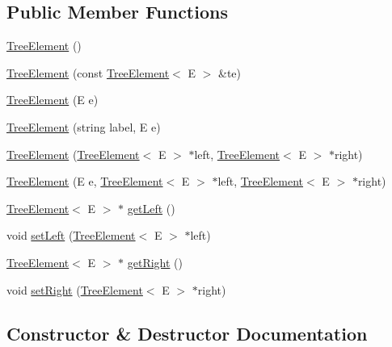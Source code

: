 \subsection*{Public Member Functions}
\begin{DoxyCompactItemize}
\item 
\hyperlink{classbridges_1_1_tree_element_a75e7d67cc9357820e9e5ce6ab0370be8}{Tree\+Element} ()
\item 
\hyperlink{classbridges_1_1_tree_element_a03a6eb569c829d3a70364f93e5241d72}{Tree\+Element} (const \hyperlink{classbridges_1_1_tree_element}{Tree\+Element}$<$ E $>$ \&te)
\item 
\hyperlink{classbridges_1_1_tree_element_ab0f11470f6983709436c700956398d78}{Tree\+Element} (E e)
\item 
\hyperlink{classbridges_1_1_tree_element_a6b5c2150ee4297fb7b341eb7d373492e}{Tree\+Element} (string label, E e)
\item 
\hyperlink{classbridges_1_1_tree_element_aa7af1081512887f5ce22ab47fe8f8624}{Tree\+Element} (\hyperlink{classbridges_1_1_tree_element}{Tree\+Element}$<$ E $>$ $\ast$left, \hyperlink{classbridges_1_1_tree_element}{Tree\+Element}$<$ E $>$ $\ast$right)
\item 
\hyperlink{classbridges_1_1_tree_element_a23151bf7f36d7f3f9e311a032d932c88}{Tree\+Element} (E e, \hyperlink{classbridges_1_1_tree_element}{Tree\+Element}$<$ E $>$ $\ast$left, \hyperlink{classbridges_1_1_tree_element}{Tree\+Element}$<$ E $>$ $\ast$right)
\item 
\hyperlink{classbridges_1_1_tree_element}{Tree\+Element}$<$ E $>$ $\ast$ \hyperlink{classbridges_1_1_tree_element_ad40ac069fa73faa46ff0398af1045c66}{get\+Left} ()
\item 
void \hyperlink{classbridges_1_1_tree_element_a68ab81b0b7da1c81f3bfbabe918a0d1a}{set\+Left} (\hyperlink{classbridges_1_1_tree_element}{Tree\+Element}$<$ E $>$ $\ast$left)
\item 
\hyperlink{classbridges_1_1_tree_element}{Tree\+Element}$<$ E $>$ $\ast$ \hyperlink{classbridges_1_1_tree_element_ae6e7ea308f95522c79ea5ca84bdbe2c1}{get\+Right} ()
\item 
void \hyperlink{classbridges_1_1_tree_element_a6c4018bbbc0597278bccf3809ed4485f}{set\+Right} (\hyperlink{classbridges_1_1_tree_element}{Tree\+Element}$<$ E $>$ $\ast$right)
\end{DoxyCompactItemize}


\subsection{Constructor \& Destructor Documentation}
\hypertarget{classbridges_1_1_tree_element_a75e7d67cc9357820e9e5ce6ab0370be8}{}
